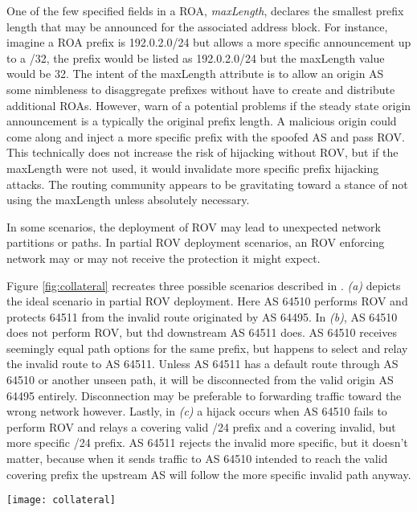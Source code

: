 \documentclass[sigconf]{acmart}
\begin{document}
One of the few specified fields in a ROA, \emph{maxLength}, declares the
smallest prefix length that may be announced for the associated address
block.  For instance, imagine a ROA prefix is 192.0.2.0/24 but allows a
more specific announcement up to a /32, the prefix would be listed as
192.0.2.0/24 but the maxLength value would be 32.  The intent of the
maxLength attribute is to allow an origin AS some nimbleness to
disaggregate prefixes without have to create and distribute additional
ROAs.  However, \cite{gilad_are_2017} warn of a potential problems if
the steady state origin announcement is a typically the original prefix
length.  A malicious origin could come along and inject a more specific
prefix with the spoofed AS and pass ROV.  This technically does not
increase the risk of hijacking without ROV, but if the maxLength were
not used, it would invalidate more specific prefix hijacking attacks.
The routing community appears to be gravitating toward a stance of not
using the maxLength unless absolutely necessary.

In some scenarios, the deployment of ROV may lead to unexpected network
partitions or paths.  In partial ROV deployment scenarios, an ROV
enforcing network may or may not receive the protection it might expect.

Figure \ref{fig:collateral} recreates three possible scenarios described
in \cite{gilad_are_2017}.  \emph{(a)} depicts the ideal scenario in
partial ROV deployment.  Here AS 64510 performs ROV and protects 64511
from the invalid route originated by AS 64495.  In \emph{(b)}, AS 64510
does not perform ROV, but thd downstream AS 64511 does.  AS 64510
receives seemingly equal path options for the same prefix, but happens
to select and relay the invalid route to AS 64511.  Unless AS 64511 has
a default route through AS 64510 or another unseen path, it will be
disconnected from the valid origin AS 64495 entirely.  Disconnection may
be preferable to forwarding traffic toward the wrong network however.
Lastly, in \emph{(c)} a hijack occurs when  AS 64510 fails to perform
ROV and relays a covering valid /24 prefix and a covering invalid, but
more specific /24 prefix.   AS 64511 rejects the invalid more specific,
but it doesn't matter, because when it sends traffic to AS 64510
intended to reach the valid covering prefix the upstream AS  will follow
the more specific invalid path anyway.

\begin{figure*}
  \centering
    \texttt{[image: collateral]}
  \caption{Partial ROV adoption scenarios}
  \label{fig:collateral}
\end{figure*}
\end{document}
